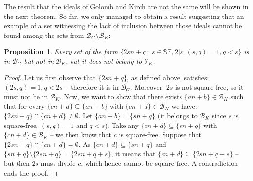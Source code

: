 \documentclass{amsart}
\newtheorem{prop}{Proposition}
\theoremstyle{definition}
\theoremstyle{definition}
\newcommand{\I}{\mathcal I}
\newcommand{\SqrFr}{\mathbb{SF}}
\begin{document}
The result that the ideals of Golomb and Kirch are not the same will be shown in the next theorem. So far, we only managed to obtain a result suggesting that an example of a set witnessing the lack of inclusion between those ideals cannot be found among the sets from $\mathcal{B}_G \setminus \mathcal{B}_K$:


\begin{prop}
Every set of the form $\{2sn+q\ :\ s \in\SqrFr, 2|s, (s,q)=1, q<s\}$ is in $\mathcal{B}_G$ but not in $\mathcal{B}_K$, but it does not belong to $\I_K$.
\end{prop}

\begin{proof}
Let us first observe that $\{2sn+q\}$, as defined above, satisfies: $(2s,q)=1, q<2s$ -- therefore it is in $\mathcal{B}_G$. Moreover, $2s$ is not square-free, so it must not be in $\mathcal{B}_K$.
Now, we want to show that there exists $\{an+b\}\in \mathcal{B}_K$ such that for every $\{cn+d\}\subseteq \{an+b\}$ with $\{cn+d\}\in \mathcal{B}_K$ we have: $\{2sn+q\}\cap \{cn+d\} \neq \emptyset$. Let $\{an+b\} = \{sn+q\}$ (it belongs to $\mathcal{B}_K$ since $s$ is square-free, $(s,q)=1$ and $q<s$). Take any $\{cn+d\}\subseteq \{sn+q\}$ with $\{cn+d\}\in \mathcal{B}_K$ -- we then know that $c$ is square-free. Suppose that $\{2sn+q\}\cap \{cn+d\} = \emptyset$. As $\{cn+d\}\subseteq \{sn+q\}$ and $\{sn+q\} \setminus \{2sn+q\} = \{2sn+q+s\}$, it means that $\{cn+d\}\subseteq \{2sn+q+s\}$ -- but then $2s$ must divide $c$, which hence cannot be square-free. A contradiction ends the proof.
\end{proof}
\end{document}
